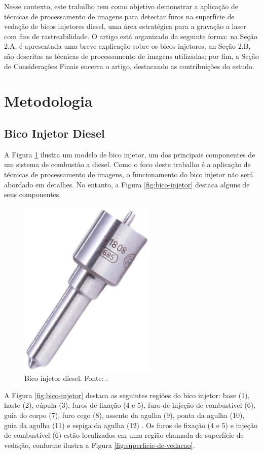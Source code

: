 \documentclass[conference]{IEEEtran}
\begin{document}
Nesse contexto, este trabalho tem como objetivo demonstrar a aplicação de técnicas de processamento de imagens para detectar furos na superfície de vedação de bicos injetores diesel, uma área estratégica para a gravação a laser com fins de rastreabilidade. O artigo está organizado da seguinte forma: na Seção 2.A, é apresentada uma breve explicação sobre os bicos injetores; an Seção 2.B, são descritas as técnicas de processamento de imagens utilizadas; por fim, a Seção de Considerações Finais encerra o artigo, destacando as contribuições do estudo.

\section{Metodologia}
\subsection{Bico Injetor Diesel}

A Figura \ref{fig:bico-injetor-real} ilustra um modelo de bico injetor, um dos principais componentes de um sistema de combustão a diesel. Como o foco deste trabalho é a aplicação de técnicas de processamento de imagens, o funcionamento do bico injetor não será abordado em detalhes. No entanto, a Figura \ref{fig:bico-injetor} destaca alguns de seus componentes.

\begin{figure}[b]
	\centering
	\includegraphics[scale=0.46]{Images/bico-injetor-real.png}
	\caption{Bico injetor diesel. Fonte: \cite{karhub}.}
	\label{fig:bico-injetor-real}
\end{figure}

A Figura \ref{fig:bico-injetor} destaca as seguintes regiões do bico injetor: base (1), haste (2), cúpula (3), furos de fixação (4 e 5), furo de injeção de combustível (6), guia do corpo (7), furo cego (8), assento da agulha (9), ponta da agulha (10), guia da agulha (11) e espiga da agulha (12) \cite{Girotto2023}. Os furos de fixação (4 e 5) e injeção de combustível (6) estão localizados em uma região chamada de superfície de vedação, conforme ilustra a Figura \ref{fig:superficie-de-vedacao}.
 
\end{document}
